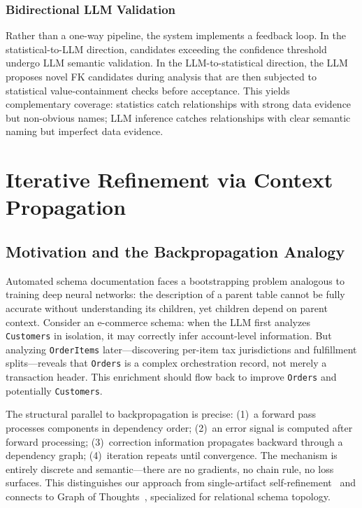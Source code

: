 \documentclass[sigconf, nonacm]{acmart}
\begin{document}
\subsubsection{Bidirectional LLM Validation}

Rather than a one-way pipeline, the system implements a feedback loop. In the statistical-to-LLM direction, candidates exceeding the confidence threshold undergo LLM semantic validation. In the LLM-to-statistical direction, the LLM proposes novel FK candidates during analysis that are then subjected to statistical value-containment checks before acceptance. This yields complementary coverage: statistics catch relationships with strong data evidence but non-obvious names; LLM inference catches relationships with clear semantic naming but imperfect data evidence.


\section{Iterative Refinement via Context Propagation}\label{sec:iterative}

\subsection{Motivation and the Backpropagation Analogy}

Automated schema documentation faces a bootstrapping problem analogous to training deep neural networks: the description of a parent table cannot be fully accurate without understanding its children, yet children depend on parent context. Consider an e-commerce schema: when the LLM first analyzes \texttt{Customers} in isolation, it may correctly infer account-level information. But analyzing \texttt{OrderItems} later---discovering per-item tax jurisdictions and fulfillment splits---reveals that \texttt{Orders} is a complex orchestration record, not merely a transaction header. This enrichment should flow back to improve \texttt{Orders} and potentially \texttt{Customers}.

The structural parallel to backpropagation is precise: (1)~a forward pass processes components in dependency order; (2)~an error signal is computed after forward processing; (3)~correction information propagates backward through a dependency graph; (4)~iteration repeats until convergence. The mechanism is entirely discrete and semantic---there are no gradients, no chain rule, no loss surfaces. This distinguishes our approach from single-artifact self-refinement~\cite{madaan2023selfrefine,shinn2023reflexion} and connects to Graph of Thoughts~\cite{besta2024got}, specialized for relational schema topology.
\end{document}
